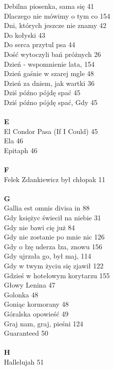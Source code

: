 \documentclass[a5paper, 10pt]{book}
\begin{document}
{\begin{multicols}{3}
    Debilna piosenka, sama się 41\\
    Dlaczego nie mówimy o tym co 154\\
    Dni, których jeszcze nie znamy 42\\
    Do kołyski 43\\
    Do serca przytul psa 44\\
    Dość wytoczyli bań próżnych 26\\
    Dzień - wspomnienie lata, 154\\
    Dzień gaśnie w szarej mgle 48\\
    Dzień za dniem, jak wartki 36\\
    Dziś późno pójdę spać 45\\
    Dziś późno pójdę spać, Gdy 45\\
    \\
    {\footnotesize \textbf{E\\} }
    El Condor Pasa (If I Could) 45\\
    Ela 46\\
    Epitaph 46\\
    \\
    {\footnotesize \textbf{F\\} }
    Felek Zdankiewicz był chłopak 11\\
    \\
    {\footnotesize \textbf{G\\} }
    Gallia est omnis divisa in 88\\
    Gdy księżyc świecił na niebie 31\\
    Gdy nie bawi cię już 84\\
    Gdy nie zostanie po mnie nic 126\\
    Gdy o łzę uderza łza, znowu 156\\
    Gdy ujrzała go, był maj, 114\\
    Gdy w twym życiu się zjawił 122\\
    Gdzieś w hotelowym korytarzu 155\\
    Głowy Lenina 47\\
    Golonka 48\\
    Goniąc kormorany 48\\
    Góralska opowieść 49\\
    Graj nam, graj, pieśni 124\\
    Guaranteed 50\\
    \\
    {\footnotesize \textbf{H\\} }
    Hallelujah 51\\

\end{multicols}}
\end{document}
